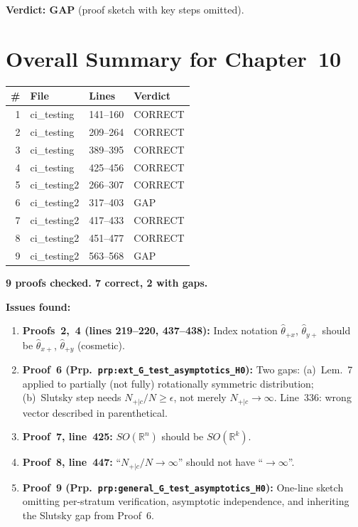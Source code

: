 \documentclass{article}
\begin{document}
\textbf{Verdict: GAP} (proof sketch with key steps omitted).

\section*{Overall Summary for Chapter~10}

\begin{center}
\begin{tabular}{r|l|l|l}
\textbf{\#} & \textbf{File} & \textbf{Lines} & \textbf{Verdict} \\ \hline
1  & ci\_testing  & 141--160   & CORRECT \\
2  & ci\_testing  & 209--264   & CORRECT \\
3  & ci\_testing  & 389--395   & CORRECT \\
4  & ci\_testing  & 425--456   & CORRECT \\
5  & ci\_testing2 & 266--307   & CORRECT \\
6  & ci\_testing2 & 317--403   & GAP \\
7  & ci\_testing2 & 417--433   & CORRECT \\
8  & ci\_testing2 & 451--477   & CORRECT \\
9  & ci\_testing2 & 563--568   & GAP \\
\end{tabular}
\end{center}

\textbf{9 proofs checked.  7 correct, 2 with gaps.}

\bigskip\noindent
\textbf{Issues found:}
\begin{enumerate}
  \item \textbf{Proofs~2,~4 (lines 219--220, 437--438):}
    Index notation $\hat\theta_{+x}$, $\hat\theta_{y+}$ should be
    $\hat\theta_{x+}$, $\hat\theta_{+y}$ (cosmetic).
  \item \textbf{Proof~6 (Prp.\ \texttt{prp:ext\_G\_test\_asymptotics\_H0}):}
    Two gaps: (a)~Lem.~7 applied to partially (not fully) rotationally
    symmetric distribution; (b)~Slutsky step needs $N_{+|c}/N\ge\epsilon$,
    not merely $N_{+|c}\to\infty$.
    Line~336: wrong vector described in parenthetical.
  \item \textbf{Proof~7, line~425:} $SO(\mathbb{R}^n)$ should be
    $SO(\mathbb{R}^k)$.
  \item \textbf{Proof~8, line~447:} ``$N_{+|c}/N\to\infty$'' should not
    have ``$\to\infty$''.
  \item \textbf{Proof~9 (Prp.\ \texttt{prp:general\_G\_test\_asymptotics\_H0}):}
    One-line sketch omitting per-stratum verification, asymptotic independence,
    and inheriting the Slutsky gap from Proof~6.
\end{enumerate}
\end{document}
